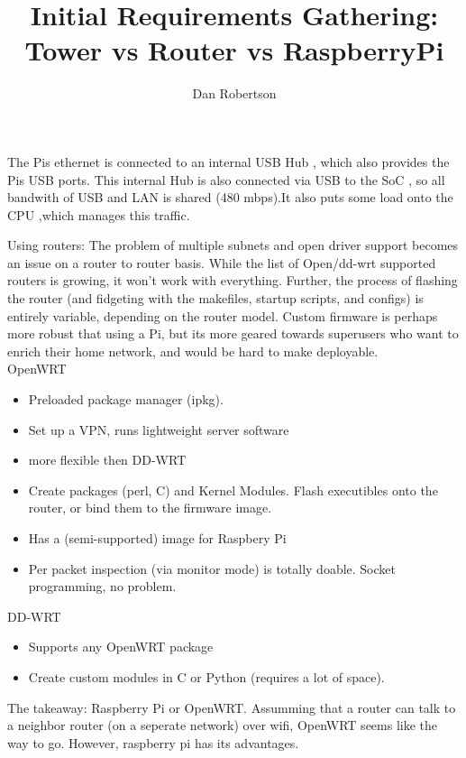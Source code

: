 \documentclass{article}
\author{Dan Robertson}
\title{Initial Requirements Gathering: Tower vs Router vs RaspberryPi}
\begin{document}
The Pis ethernet is connected to an internal USB Hub , which also provides the 
Pis USB ports. This internal Hub is also connected via USB to the SoC , so all
bandwith of USB and LAN is shared (480 mbps).It also puts some load onto the CPU ,which manages this traffic. 

Using routers: The problem of multiple subnets and open driver support becomes an issue on a router to router basis. While the list of Open/dd-wrt supported routers is growing, it won't work with everything. Further, the process of flashing the router (and fidgeting with the makefiles, startup scripts, and configs) is entirely variable, depending on the router model. Custom firmware is 
perhaps more robust that using a Pi, but its more geared towards superusers who want to enrich their home network, and would be hard to make deployable.
\\
OpenWRT
\noindent
\begin{itemize}
\item Preloaded package manager (ipkg).
\item Set up a VPN, runs lightweight server software
\item more flexible then DD-WRT
\item Create packages (perl, C) and Kernel Modules. Flash executibles onto the router, or bind them to the firmware image.
\item Has a (semi-supported) image for Raspbery Pi
\item Per packet inspection (via monitor mode) is totally doable. Socket programming, no problem.
\end{itemize}

DD-WRT
\begin{itemize}
\item Supports any OpenWRT package
\item Create custom modules in C or Python (requires a lot of space).
\end{itemize}

The takeaway: Raspberry Pi or OpenWRT. Assumming that a router can talk to a neighbor router (on a seperate network) over wifi, OpenWRT seems like the way to go. However, raspberry pi has its advantages.
\end{document}
